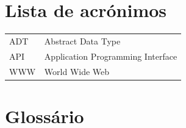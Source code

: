 \documentclass[11pt,a4paper]{report}
\begin{document}
\chapter*{Lista de acrónimos}

\begin{flushleft}
\begin{tabular}{l p{0.8\linewidth}}
ADT      & Abstract Data Type\\
API      & Application Programming Interface\\
WWW      & World Wide Web
\end{tabular}
\end{flushleft}

\chapter*{Glossário}
\end{document}
